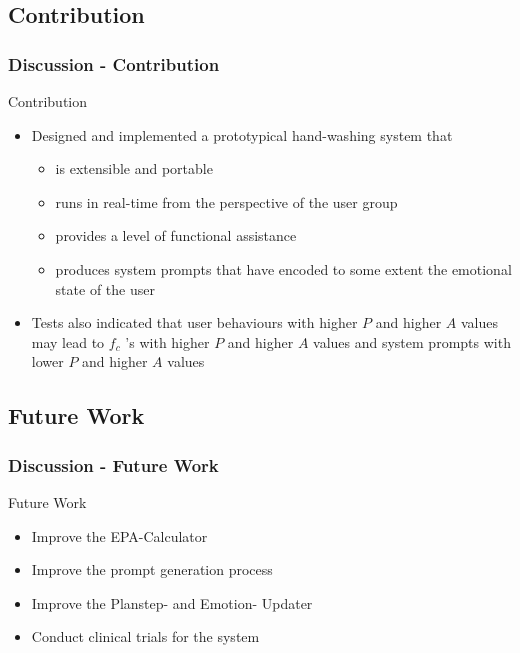 \documentclass{beamer}
\begin{document}
\subsection{Contribution}
\begin{frame}
\frametitle{Discussion - Contribution}
Contribution
\vspace{.3cm}
\begin{itemize}
\item Designed and implemented a prototypical hand-washing system that
\begin{itemize}
\item is extensible and portable
\item runs in real-time from the perspective of the user group
\item provides a level of functional assistance
\item produces system prompts that have encoded to some extent the emotional state of the user
\end{itemize}
\vspace{.3cm}
\item Tests also indicated that user behaviours with higher $P$ and higher $A$ values may lead to $f_c$ 's with higher $P$ and higher $A$ values and system prompts with lower $P$ and higher $A$ values
\end{itemize}
\end{frame}

\subsection{Future Work}
\begin{frame}
\frametitle{Discussion - Future Work}
Future Work
\vspace{.3cm}
\begin{itemize}
\item{Improve the EPA-Calculator}
\item{Improve the prompt generation process}
\item{Improve the Planstep- and Emotion- Updater}
\item{Conduct clinical trials for the system}
\end{itemize}
\end{frame}
\end{document}
